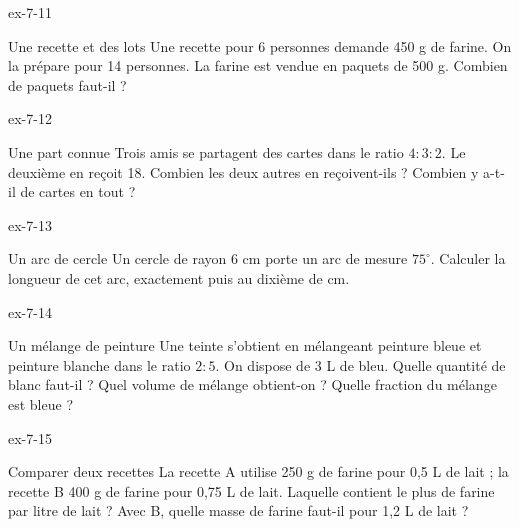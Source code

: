 \begin{blocLivre}{ex-7-11}\begin{exercice}[3]{Une recette et des lots}
Une recette pour 6 personnes demande 450 g de farine. On la prépare pour 14 personnes. La farine est vendue en paquets de 500 g. Combien de paquets faut-il ?
\end{exercice}\end{blocLivre}
\begin{blocLivre}{ex-7-12}\begin{exercice}[3]{Une part connue}
Trois amis se partagent des cartes dans le ratio $4:3:2$. Le deuxième en reçoit 18. Combien les deux autres en reçoivent-ils ? Combien y a-t-il de cartes en tout ?
\end{exercice}\end{blocLivre}
\begin{blocLivre}{ex-7-13}\begin{exercice}[3]{Un arc de cercle}
Un cercle de rayon 6 cm porte un arc de mesure $75^\circ$. Calculer la longueur de cet arc, exactement puis au dixième de cm.
\label{fig-ex-7-13}
\end{exercice}\end{blocLivre}
\begin{blocLivre}{ex-7-14}\begin{exercice}[3]{Un mélange de peinture}
Une teinte s’obtient en mélangeant peinture bleue et peinture blanche dans le ratio $2:5$. On dispose de 3 L de bleu. Quelle quantité de blanc faut-il ? Quel volume de mélange obtient-on ? Quelle fraction du mélange est bleue ?
\end{exercice}\end{blocLivre}
\begin{blocLivre}{ex-7-15}\begin{exercice}[3]{Comparer deux recettes}
La recette A utilise 250 g de farine pour 0,5 L de lait ; la recette B 400 g de farine pour 0,75 L de lait. Laquelle contient le plus de farine par litre de lait ? Avec B, quelle masse de farine faut-il pour 1,2 L de lait ?
\end{exercice}\end{blocLivre}

\clearpage
